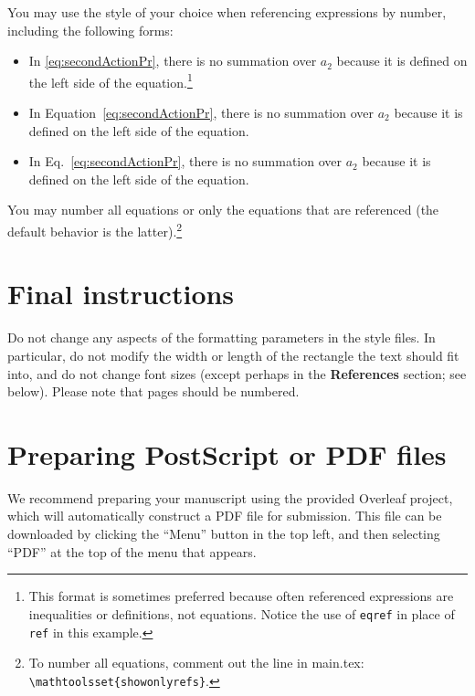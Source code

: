 \documentclass[10pt]{article} %
\begin{document}
You may use the style of your choice when referencing expressions by number, including the following forms: 
\begin{itemize}
    \item In \eqref{eq:secondActionPr}, there is no summation over $a_2$ because it is defined on the left side of the equation.\footnote{This format is sometimes preferred because often referenced expressions are inequalities or definitions, not equations. Notice the use of \texttt{eqref} in place of \texttt{ref} in this example.}
    \item In Equation~\ref{eq:secondActionPr}, there is no summation over $a_2$ because it is defined on the left side of the equation.
    \item In Eq.~\ref{eq:secondActionPr}, there is no summation over $a_2$ because it is defined on the left side of the equation.
\end{itemize}
You may number all equations or only the equations that are referenced (the default behavior is the latter).\footnote{To number all equations, comment out the line in main.tex: \texttt{\textbackslash mathtoolsset\{showonlyrefs\}}.}

\section{Final instructions}
\label{sec:final}
Do not change any aspects of the formatting parameters in the style files. In particular, do not modify the width or length of the rectangle the text should fit into, and do not change font sizes (except perhaps in the \textbf{References} section; see below). Please note that pages should be numbered.

\section{Preparing PostScript or PDF files}
\label{sec:prep}
We recommend preparing your manuscript using the provided Overleaf project, which will automatically construct a PDF file for submission. This file can be downloaded by clicking the ``Menu'' button in the top left, and then selecting ``PDF'' at the top of the menu that appears.
\end{document}
